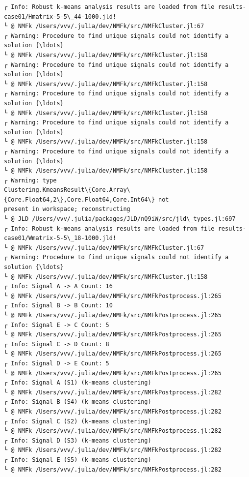 \documentclass[11pt]{article}
\begin{document}
    \begin{Verbatim}[commandchars=\\\{\}]
┌ Info: Robust k-means analysis results are loaded from file results-
case01/Hmatrix-5-5\_44-1000.jld!
└ @ NMFk /Users/vvv/.julia/dev/NMFk/src/NMFkCluster.jl:67
┌ Warning: Procedure to find unique signals could not identify a solution {\ldots}
└ @ NMFk /Users/vvv/.julia/dev/NMFk/src/NMFkCluster.jl:158
┌ Warning: Procedure to find unique signals could not identify a solution {\ldots}
└ @ NMFk /Users/vvv/.julia/dev/NMFk/src/NMFkCluster.jl:158
┌ Warning: Procedure to find unique signals could not identify a solution {\ldots}
└ @ NMFk /Users/vvv/.julia/dev/NMFk/src/NMFkCluster.jl:158
┌ Warning: Procedure to find unique signals could not identify a solution {\ldots}
└ @ NMFk /Users/vvv/.julia/dev/NMFk/src/NMFkCluster.jl:158
┌ Warning: Procedure to find unique signals could not identify a solution {\ldots}
└ @ NMFk /Users/vvv/.julia/dev/NMFk/src/NMFkCluster.jl:158
┌ Warning: type
Clustering.KmeansResult\{Core.Array\{Core.Float64,2\},Core.Float64,Core.Int64\} not
present in workspace; reconstructing
└ @ JLD /Users/vvv/.julia/packages/JLD/nQ9iW/src/jld\_types.jl:697
┌ Info: Robust k-means analysis results are loaded from file results-
case01/Wmatrix-5-5\_18-1000.jld!
└ @ NMFk /Users/vvv/.julia/dev/NMFk/src/NMFkCluster.jl:67
┌ Warning: Procedure to find unique signals could not identify a solution {\ldots}
└ @ NMFk /Users/vvv/.julia/dev/NMFk/src/NMFkCluster.jl:158
┌ Info: Signal A -> A Count: 16
└ @ NMFk /Users/vvv/.julia/dev/NMFk/src/NMFkPostprocess.jl:265
┌ Info: Signal B -> B Count: 10
└ @ NMFk /Users/vvv/.julia/dev/NMFk/src/NMFkPostprocess.jl:265
┌ Info: Signal E -> C Count: 5
└ @ NMFk /Users/vvv/.julia/dev/NMFk/src/NMFkPostprocess.jl:265
┌ Info: Signal C -> D Count: 8
└ @ NMFk /Users/vvv/.julia/dev/NMFk/src/NMFkPostprocess.jl:265
┌ Info: Signal D -> E Count: 5
└ @ NMFk /Users/vvv/.julia/dev/NMFk/src/NMFkPostprocess.jl:265
┌ Info: Signal A (S1) (k-means clustering)
└ @ NMFk /Users/vvv/.julia/dev/NMFk/src/NMFkPostprocess.jl:282
┌ Info: Signal B (S4) (k-means clustering)
└ @ NMFk /Users/vvv/.julia/dev/NMFk/src/NMFkPostprocess.jl:282
┌ Info: Signal C (S2) (k-means clustering)
└ @ NMFk /Users/vvv/.julia/dev/NMFk/src/NMFkPostprocess.jl:282
┌ Info: Signal D (S3) (k-means clustering)
└ @ NMFk /Users/vvv/.julia/dev/NMFk/src/NMFkPostprocess.jl:282
┌ Info: Signal E (S5) (k-means clustering)
└ @ NMFk /Users/vvv/.julia/dev/NMFk/src/NMFkPostprocess.jl:282
    \end{Verbatim}
\end{document}
